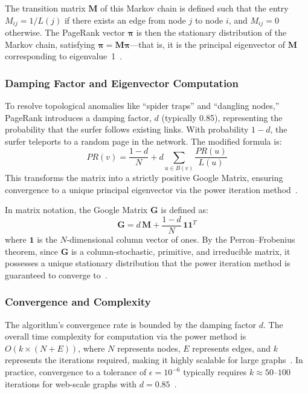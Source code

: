 The transition matrix $\mathbf{M}$ of this Markov chain is defined such that the entry $M_{ij} = 1/L(j)$ if there exists an edge from node $j$ to node $i$, and $M_{ij} = 0$ otherwise. The PageRank vector $\boldsymbol{\pi}$ is then the stationary distribution of the Markov chain, satisfying $\boldsymbol{\pi} = \mathbf{M}\boldsymbol{\pi}$---that is, it is the principal eigenvector of $\mathbf{M}$ corresponding to eigenvalue~1~\cite{stanford1999pagerank}.


\subsubsection{Damping Factor and Eigenvector Computation}

To resolve topological anomalies like ``spider traps'' and ``dangling nodes,'' PageRank introduces a damping factor, $d$ (typically 0.85), representing the probability that the surfer follows existing links. With probability $1-d$, the surfer teleports to a random page in the network. The modified formula is:
\begin{equation}
\label{eq:pagerank_damped}
PR(v) = \frac{1-d}{N} + d \sum_{u \in B(v)} \frac{PR(u)}{L(u)}
\end{equation}
This transforms the matrix into a strictly positive Google Matrix, ensuring convergence to a unique principal eigenvector via the power iteration method~\cite{brin1998pagerank, stanford1999pagerank}.

In matrix notation, the Google Matrix $\mathbf{G}$ is defined as:
\begin{equation}
\label{eq:google_matrix}
\mathbf{G} = d\,\mathbf{M} + \frac{1-d}{N}\,\mathbf{1}\mathbf{1}^{T}
\end{equation}
where $\mathbf{1}$ is the $N$-dimensional column vector of ones. By the Perron--Frobenius theorem, since $\mathbf{G}$ is a column-stochastic, primitive, and irreducible matrix, it possesses a unique stationary distribution that the power iteration method is guaranteed to converge to~\cite{stanford1999pagerank, mdpi_gluing}.


\subsubsection{Convergence and Complexity}

The algorithm's convergence rate is bounded by the damping factor $d$. The overall time complexity for computation via the power method is $O(k \times (N + E))$, where $N$ represents nodes, $E$ represents edges, and $k$ represents the iterations required, making it highly scalable for large graphs~\cite{brin1998pagerank, stanford1999pagerank}. In practice, convergence to a tolerance of $\epsilon = 10^{-6}$ typically requires $k \approx 50$--$100$ iterations for web-scale graphs with $d = 0.85$~\cite{stanford1999pagerank}.

